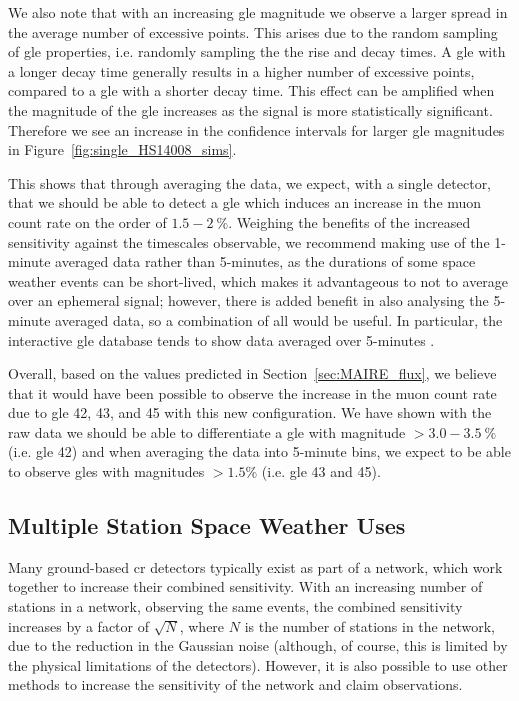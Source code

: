 We also note that with an increasing \gls{gle} magnitude we observe a larger spread in the average number of excessive points. This arises due to the random sampling of \gls{gle} properties, i.e. randomly sampling the the rise and decay times. A \gls{gle} with a longer decay time generally results in a higher number of excessive points, compared to a \gls{gle} with a shorter decay time. This effect can be amplified when the magnitude of the \gls{gle} increases as the signal is more statistically significant. Therefore we see an increase in the confidence intervals for larger \gls{gle} magnitudes in Figure~\ref{fig:single_HS14008_sims}.


This shows that through averaging the data, we expect, with a single detector, that we should be able to detect a \gls{gle} which induces an increase in the muon count rate on the order of $1.5-2~\%$. Weighing the benefits of the increased sensitivity against the timescales observable, we recommend making use of the 1-minute averaged data rather than 5-minutes, as the durations of some space weather events can be short-lived, which makes it advantageous to not to average over an ephemeral signal; however, there is added benefit in also analysing the 5-minute averaged data, so a combination of all would be useful. In particular, the interactive \gls{gle} database tends to show data averaged over 5-minutes \citep{usoskin_database_2016}.

Overall, based on the values predicted in Section~\ref{sec:MAIRE_flux}, we believe that it would have been possible to observe the increase in the muon count rate due to \gls{gle} 42, 43, and 45 with this new configuration. We have shown with the raw data we should be able to differentiate a \gls{gle} with magnitude $>3.0-3.5~\%$ (i.e. \gls{gle} 42) and when averaging the data into 5-minute bins, we expect to be able to observe \glspl{gle} with magnitudes $> 1.5 \%$  (i.e. \gls{gle} 43 and 45). 


\subsection{Multiple Station Space Weather Uses}\label{sec:HS_14008_multi_sims}


Many ground-based \gls{cr} detectors typically exist as part of a network, which work together to increase their combined sensitivity. With an increasing number of stations in a network, observing the same events, the combined sensitivity increases by a factor of $\sqrt{N}$, where $N$ is the number of stations in the network, due to the reduction in the Gaussian noise (although, of course, this is limited by the physical limitations of the detectors). However, it is also possible to use other methods to increase the sensitivity of the network and claim observations.


